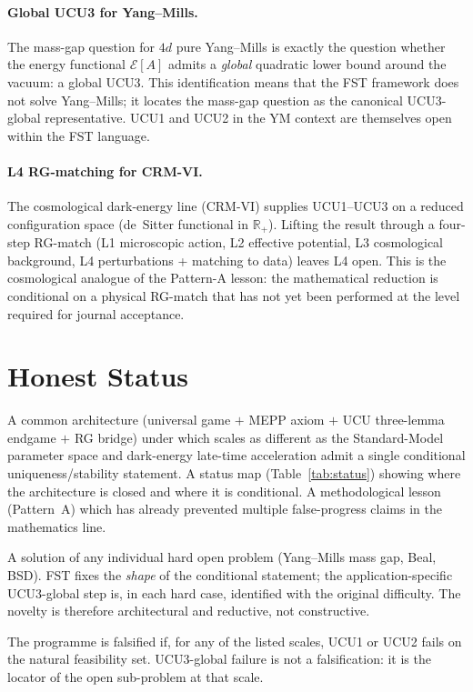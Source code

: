 \documentclass[11pt,a4paper]{article}
\theoremstyle{remark}
\begin{document}
\paragraph{Global UCU3 for Yang--Mills.}
The mass-gap question for $4d$ pure Yang--Mills is exactly the
question whether the energy functional $\mathcal{E}[A]$ admits a
\emph{global} quadratic lower bound around the vacuum: a global UCU3.
This identification means that the FST framework does not solve
Yang--Mills; it locates the mass-gap question as the canonical
UCU3-global representative. UCU1 and UCU2 in the YM context are
themselves open within the FST language.

\paragraph{L4 RG-matching for CRM-VI.}
The cosmological dark-energy line (CRM-VI) supplies UCU1--UCU3 on a
reduced configuration space (de~Sitter functional in
$\mathbb{R}_+$). Lifting the result through a four-step RG-match
(L1 microscopic action, L2 effective potential, L3 cosmological
background, L4 perturbations + matching to data) leaves L4 open.
This is the cosmological analogue of the Pattern-A lesson: the
mathematical reduction is conditional on a physical RG-match that
has not yet been performed at the level required for journal
acceptance.

\section{Honest Status}
\label{sec:honest-status}

\begin{description}[leftmargin=2em,style=nextline]
\item[What FST delivers.]
A common architecture (universal game $+$ MEPP axiom $+$ UCU
three-lemma endgame $+$ RG bridge) under which scales as different
as the Standard-Model parameter space and dark-energy late-time
acceleration admit a single conditional uniqueness/stability
statement. A status map (Table~\ref{tab:status}) showing where
the architecture is closed and where it is conditional. A
methodological lesson (Pattern~A) which has already prevented
multiple false-progress claims in the mathematics line.

\item[What FST does \emph{not} deliver.]
A solution of any individual hard open problem (Yang--Mills mass
gap, Beal, BSD). FST fixes the \emph{shape} of the conditional
statement; the application-specific UCU3-global step is, in each
hard case, identified with the original difficulty. The novelty
is therefore architectural and reductive, not constructive.

\item[Falsification criterion.]
The programme is falsified if, for any of the listed scales, UCU1
or UCU2 fails on the natural feasibility set. UCU3-global failure
is not a falsification: it is the locator of the open sub-problem
at that scale.
\end{description}
\end{document}
